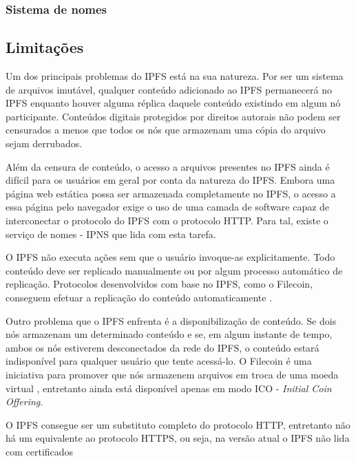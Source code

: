 \documentclass[tcc,capa]{texufpel}
\begin{document}
        \subsubsection{Sistema de nomes}
    
    \subsection{Limitações}
    
    Um dos principais problemas do IPFS está na sua natureza. Por ser um sistema de arquivos imutável, qualquer conteúdo adicionado ao IPFS permanecerá no IPFS enquanto houver alguma réplica daquele conteúdo existindo em algum nó participante. Conteúdos digitais protegidos por direitos autorais não podem ser censurados a menos que todos os nós que armazenam uma cópia do arquivo sejam derrubados.
    
    Além da censura de conteúdo, o acesso a arquivos presentes no IPFS ainda é difícil para os usuários em geral por conta da natureza do IPFS. Embora uma página web estática possa ser armazenada completamente no IPFS, o acesso a essa página pelo navegador exige o uso de uma camada de software capaz de interconectar o protocolo do IPFS com o protocolo HTTP. Para tal, existe o serviço de nomes - IPNS que lida com esta tarefa.
    
    O IPFS não executa ações sem que o usuário invoque-as explicitamente. Todo conteúdo deve ser replicado manualmente ou por algum processo automático de replicação. Protocolos desenvolvidos com base no IPFS, como o Filecoin, conseguem efetuar a replicação do conteúdo automaticamente \cite{jbenet47issue}.
    
    Outro problema que o IPFS enfrenta é a disponibilização de conteúdo. Se dois nós armazenam um determinado conteúdo e se, em algum instante de tempo, ambos os nós estiverem desconectados da rede do IPFS, o conteúdo estará indisponível para qualquer usuário que tente acessá-lo. O Filecoin é uma iniciativa para promover que nós armazenem arquivos em troca de uma moeda virtual \cite{protocollabs}, entretanto ainda está disponível apenas em modo ICO - \textit{Initial Coin Offering}.
    
    O IPFS consegue ser um substituto completo do protocolo HTTP, entretanto não há um equivalente ao protocolo HTTPS, ou seja, na versão atual o IPFS não lida com certificados 
        
\end{document}
